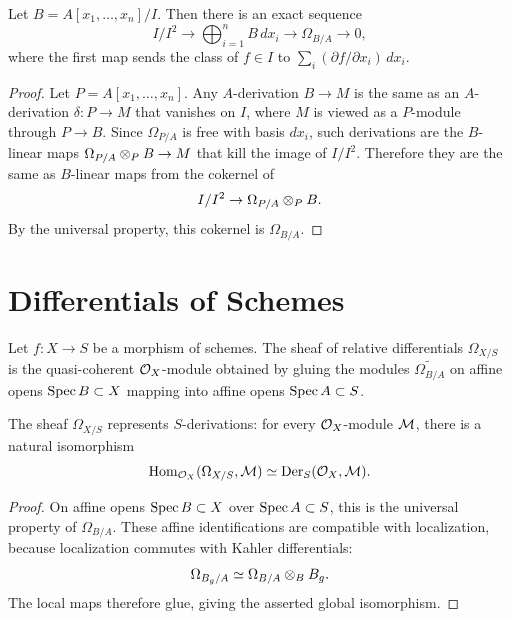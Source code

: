 \begin{proposition}
Let \(B=A[x_1,\ldots,x_n]/I\).  Then there is an exact sequence
\[
    I/I^2\longrightarrow
    \bigoplus_{i=1}^n B\,dx_i
    \longrightarrow \Omega_{B/A}\longrightarrow 0,
\]
where the first map sends the class of \(f\in I\) to
\(\sum_i (\partial f/\partial x_i)\,dx_i\).
\end{proposition}

\begin{proof}
Let \(P=A[x_1,\ldots,x_n]\).  Any \(A\)-derivation \(B\to M\) is the same as an
\(A\)-derivation \(\delta:P\to M\) that vanishes on \(I\), where \(M\) is viewed
as a \(P\)-module through \(P\to B\).  Since \(\Omega_{P/A}\) is free with basis
\(dx_i\), such derivations are the \(B\)-linear maps
\(\Omega_{P/A}\otimes_P B\to M\) that kill the image of \(I/I^2\).  Therefore
they are the same as \(B\)-linear maps from the cokernel of
\[
    I/I^2\to\Omega_{P/A}\otimes_P B.
\]
By the universal property, this cokernel is \(\Omega_{B/A}\).
\end{proof}

\section{Differentials of Schemes}

\begin{definition}
Let \(f:X\to S\) be a morphism of schemes.  The sheaf of relative differentials
\(\Omega_{X/S}\) is the quasi-coherent \(\mathcal{O}_X\)-module obtained by gluing the
modules \(\widetilde{\Omega_{B/A}}\) on affine opens
\(\operatorname{Spec} B\subset X\) mapping into affine opens \(\operatorname{Spec} A\subset S\).
\end{definition}

\begin{proposition}
The sheaf \(\Omega_{X/S}\) represents \(S\)-derivations: for every
\(\mathcal{O}_X\)-module \(\mathcal{M}\), there is a natural isomorphism
\[
    \operatorname{Hom}_{\mathcal{O}_X}(\Omega_{X/S},\mathcal{M})
    \simeq
    \operatorname{Der}_S(\mathcal{O}_X,\mathcal{M}).
\]
\end{proposition}

\begin{proof}
On affine opens \(\operatorname{Spec} B\subset X\) over \(\operatorname{Spec} A\subset S\), this is the
universal property of \(\Omega_{B/A}\).  These affine identifications are
compatible with localization, because localization commutes with Kahler
differentials:
\[
    \Omega_{B_g/A}\simeq \Omega_{B/A}\otimes_B B_g.
\]
The local maps therefore glue, giving the asserted global isomorphism.
\end{proof}

